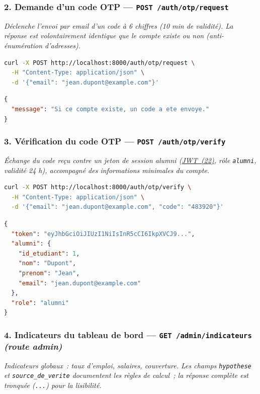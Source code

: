 \documentclass[12pt,a4paper]{report}
\begin{document}
\subsubsection*{2. Demande d'un code OTP — \texttt{POST /auth/otp/request}}
\emph{Déclenche l'envoi par email d'un code à 6 chiffres (10 min de validité). La réponse est volontairement identique que le compte existe ou non (anti-énumération d'adresses).}

\begin{lstlisting}[language=bash, caption={Envoi du code OTP par email}, label={lst:curl-otp}]
curl -X POST http://localhost:8000/auth/otp/request \
  -H "Content-Type: application/json" \
  -d '{"email": "jean.dupont@example.com"}'
\end{lstlisting}
\begin{lstlisting}[language=json, caption={Réponse — confirmation d'envoi}, label={resp:curl-otp}]
{
  "message": "Si ce compte existe, un code a ete envoye."
}
\end{lstlisting}

\subsubsection*{3. Vérification du code OTP — \texttt{POST /auth/otp/verify}}
\emph{Échange du code reçu contre un jeton de session alumni (\hyperlink{abbr-JWT}{JWT~(22)}, rôle \texttt{alumni}, validité 24 h), accompagné des informations minimales du compte.}

\begin{lstlisting}[language=bash, caption={Vérification OTP}, label={lst:curl-otp-verify}]
curl -X POST http://localhost:8000/auth/otp/verify \
  -H "Content-Type: application/json" \
  -d '{"email": "jean.dupont@example.com", "code": "483920"}'
\end{lstlisting}
\begin{lstlisting}[language=json, caption={Réponse — token de session alumni}, label={resp:curl-otp-verify}]
{
  "token": "eyJhbGciOiJIUzI1NiIsInR5cCI6IkpXVCJ9...",
  "alumni": {
    "id_etudiant": 1,
    "nom": "Dupont",
    "prenom": "Jean",
    "email": "jean.dupont@example.com"
  },
  "role": "alumni"
}
\end{lstlisting}

\subsubsection*{4. Indicateurs du tableau de bord — \texttt{GET /admin/indicateurs} \emph{(route admin)}}
\emph{Indicateurs globaux~: taux d'emploi, salaires, couverture. Les champs \texttt{hypothese} et \texttt{source\_de\_verite} documentent les règles de calcul~; la réponse complète est tronquée (\texttt{...}) pour la lisibilité.}
\end{document}
